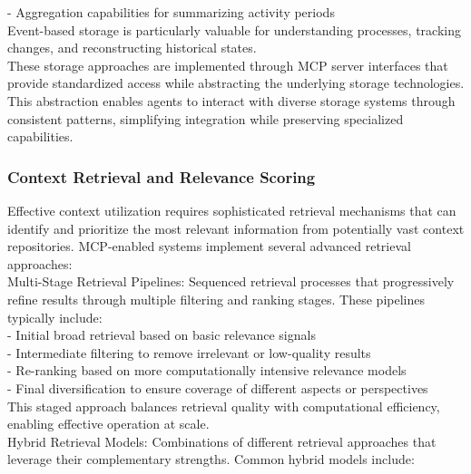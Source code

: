 - Aggregation capabilities for summarizing activity periods\\ \newline
Event-based storage is particularly valuable for understanding processes, tracking changes, and reconstructing historical states.\\ \newline
These storage approaches are implemented through MCP server interfaces that provide standardized access while abstracting the underlying storage technologies. This abstraction enables agents to interact with diverse storage systems through consistent patterns, simplifying integration while preserving specialized capabilities.\\
\subsubsection{Context Retrieval and Relevance Scoring}
Effective context utilization requires sophisticated retrieval mechanisms that can identify and prioritize the most relevant information from potentially vast context repositories. MCP-enabled systems implement several advanced retrieval approaches:\\ \newline
Multi-Stage Retrieval Pipelines: Sequenced retrieval processes that progressively refine results through multiple filtering and ranking stages. These pipelines typically include:\\ \newline
- Initial broad retrieval based on basic relevance signals\\ \newline
- Intermediate filtering to remove irrelevant or low-quality results\\ \newline
- Re-ranking based on more computationally intensive relevance models\\ \newline
- Final diversification to ensure coverage of different aspects or perspectives\\ \newline
This staged approach balances retrieval quality with computational efficiency, enabling effective operation at scale.\\ \newline
Hybrid Retrieval Models: Combinations of different retrieval approaches that leverage their complementary strengths. Common hybrid models include:\\ \newline
